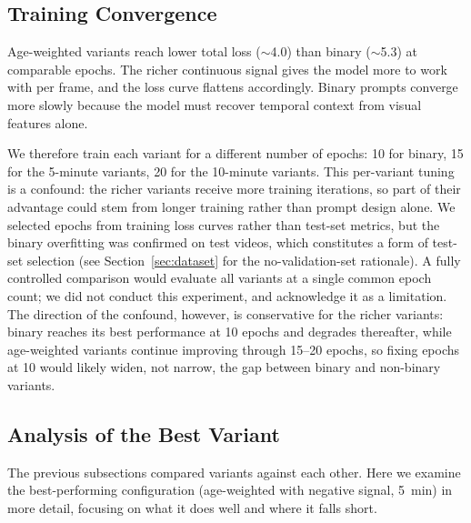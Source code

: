 \documentclass[1p,11pt]{elsarticle}
\begin{document}
\subsection{Training Convergence}
\label{sec:training}

Age-weighted variants reach lower total loss ($\sim$4.0) than binary ($\sim$5.3) at comparable epochs. The richer continuous signal gives the model more to work with per frame, and the loss curve flattens accordingly. Binary prompts converge more slowly because the model must recover temporal context from visual features alone.

We therefore train each variant for a different number of epochs: 10 for binary, 15 for the 5-minute variants, 20 for the 10-minute variants. This per-variant tuning is a confound: the richer variants receive more training iterations, so part of their advantage could stem from longer training rather than prompt design alone. We selected epochs from training loss curves rather than test-set metrics, but the binary overfitting was confirmed on test videos, which constitutes a form of test-set selection (see Section~\ref{sec:dataset} for the no-validation-set rationale). A fully controlled comparison would evaluate all variants at a single common epoch count; we did not conduct this experiment, and acknowledge it as a limitation. The direction of the confound, however, is conservative for the richer variants: binary reaches its best performance at 10 epochs and degrades thereafter, while age-weighted variants continue improving through 15--20 epochs, so fixing epochs at 10 would likely widen, not narrow, the gap between binary and non-binary variants.

\subsection{Analysis of the Best Variant}

The previous subsections compared variants against each other. Here we examine the best-performing configuration (age-weighted with negative signal, 5~min) in more detail, focusing on what it does well and where it falls short.
\end{document}
